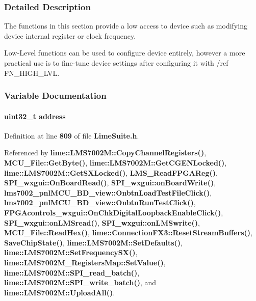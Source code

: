 \subsubsection{Detailed Description}
The functions in this section provide a low access to device such as modifying device internal register or clock frequency. 

Low-\/\+Level functions can be used to configure device entirely, however a more practical use is to fine-\/tune device settings after configuring it with /ref F\+N\+\_\+\+H\+I\+G\+H\+\_\+\+L\+VL. 

\subsubsection{Variable Documentation}
\paragraph[{address}]{\setlength{\rightskip}{0pt plus 5cm}uint32\+\_\+t address}\label{group__FN__LOW__LVL_gac0d31ca829f934cccd89f8054e02773e}


Definition at line {\bf 809} of file {\bf Lime\+Suite.\+h}.



Referenced by {\bf lime\+::\+L\+M\+S7002\+M\+::\+Copy\+Channel\+Registers()}, {\bf M\+C\+U\+\_\+\+File\+::\+Get\+Byte()}, {\bf lime\+::\+L\+M\+S7002\+M\+::\+Get\+C\+G\+E\+N\+Locked()}, {\bf lime\+::\+L\+M\+S7002\+M\+::\+Get\+S\+X\+Locked()}, {\bf L\+M\+S\+\_\+\+Read\+F\+P\+G\+A\+Reg()}, {\bf S\+P\+I\+\_\+wxgui\+::\+On\+Board\+Read()}, {\bf S\+P\+I\+\_\+wxgui\+::on\+Board\+Write()}, {\bf lms7002\+\_\+pnl\+M\+C\+U\+\_\+\+B\+D\+\_\+view\+::\+Onbtn\+Load\+Test\+File\+Click()}, {\bf lms7002\+\_\+pnl\+M\+C\+U\+\_\+\+B\+D\+\_\+view\+::\+Onbtn\+Run\+Test\+Click()}, {\bf F\+P\+G\+Acontrols\+\_\+wxgui\+::\+On\+Chk\+Digital\+Loopback\+Enable\+Click()}, {\bf S\+P\+I\+\_\+wxgui\+::on\+L\+M\+Sread()}, {\bf S\+P\+I\+\_\+wxgui\+::on\+L\+M\+Swrite()}, {\bf M\+C\+U\+\_\+\+File\+::\+Read\+Hex()}, {\bf lime\+::\+Connection\+F\+X3\+::\+Reset\+Stream\+Buffers()}, {\bf Save\+Chip\+State()}, {\bf lime\+::\+L\+M\+S7002\+M\+::\+Set\+Defaults()}, {\bf lime\+::\+L\+M\+S7002\+M\+::\+Set\+Frequency\+S\+X()}, {\bf lime\+::\+L\+M\+S7002\+M\+\_\+\+Registers\+Map\+::\+Set\+Value()}, {\bf lime\+::\+L\+M\+S7002\+M\+::\+S\+P\+I\+\_\+read\+\_\+batch()}, {\bf lime\+::\+L\+M\+S7002\+M\+::\+S\+P\+I\+\_\+write\+\_\+batch()}, and {\bf lime\+::\+L\+M\+S7002\+M\+::\+Upload\+All()}.

